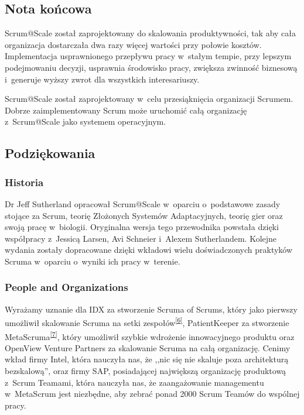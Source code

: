 \documentclass[12pt,a4paper,parskip=full]{scrartcl}
\begin{document}
\subsection{Nota końcowa}\label{End-Note}

Scrum@Scale został zaprojektowany do skalowania produktywności, tak aby cała organizacja dostarczała dwa razy więcej wartości przy połowie kosztów. Implementacja usprawnionego przepływu pracy w~stałym tempie, przy lepszym podejmowaniu decyzji, usprawnia środowisko pracy, zwiększa zwinność biznesową i~generuje wyższy zwrot dla wszystkich interesariuszy.

Scrum@Scale został zaprojektowany w~celu przesiąknięcia organizacji Scrumem. Dobrze zaimplementowany Scrum może uruchomić całą organizację z~Scrum@Scale jako systemem operacyjnym.

\subsection{Podziękowania}\label{Acknowledgements}

\subsubsection{Historia}\label{History}

Dr Jeff Sutherland opracował Scrum@Scale w~oparciu o~podstawowe zasady stojące za Scrum, teorię Złożonych Systemów Adaptacyjnych, teorię gier oraz swoją pracę w~biologii. Oryginalna wersja tego przewodnika powstała dzięki współpracy z~Jessicą Larsen, Avi Schneier i~Alexem Sutherlandem. Kolejne wydania zostały dopracowane dzięki wkładowi wielu doświadczonych praktyków Scruma w~oparciu o~wyniki ich pracy w~terenie.

\subsubsection{People and Organizations}\label{People-and-Organizations}

Wyrażamy uznanie dla IDX za stworzenie Scruma of Scrums, który jako pierwszy umożliwił skalowanie Scruma na setki zespołów\textsuperscript{\ref{6}}, PatientKeeper za stworzenie MetaScruma\textsuperscript{\ref{7}}, który umożliwił szybkie wdrożenie innowacyjnego produktu oraz OpenView Venture Partners za skalowanie Scruma na całą organizację. Cenimy wkład firmy Intel, która nauczyła nas, że ,,nic się nie skaluje poza architekturą bezskalową'', oraz firmy SAP, posiadającej największą organizację produktową z~Scrum Teamami, która nauczyła nas, że zaangażowanie managementu w~MetaScrum jest niezbędne, aby zebrać ponad 2000 Scrum Teamów do wspólnej pracy.
\end{document}
